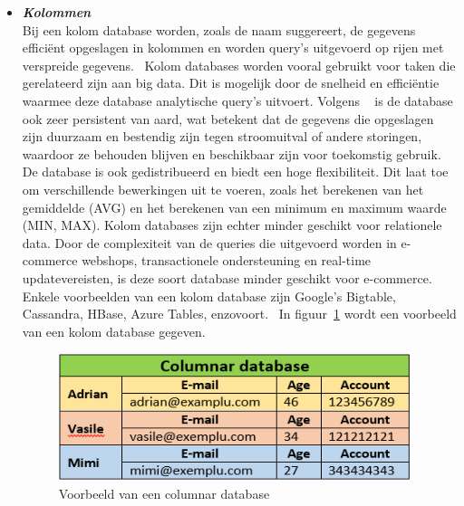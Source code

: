 \begin{itemize}
      \item \textbf{\textit{Kolommen}} \\
            Bij een kolom database worden, zoals de naam suggereert, de gegevens efficiënt opgeslagen in kolommen en worden query's uitgevoerd op rijen met verspreide gegevens.~\autocite{Microsoft} Kolom databases worden vooral gebruikt voor taken die gerelateerd zijn aan big data. Dit is mogelijk door de snelheid en efficiëntie waarmee deze database analytische query’s uitvoert. Volgens ~\textcite{DistributedDatabase2022} is de database ook zeer persistent van aard, wat betekent dat de gegevens die opgeslagen zijn duurzaam en bestendig zijn tegen stroomuitval of andere storingen, waardoor ze behouden blijven en beschikbaar zijn voor toekomstig gebruik. De database is ook gedistribueerd en biedt een hoge flexibiliteit. Dit laat toe om verschillende bewerkingen uit te voeren, zoals het berekenen van het gemiddelde (AVG) en het berekenen van een minimum en maximum waarde (MIN, MAX). Kolom databases zijn echter minder geschikt voor relationele data. Door de complexiteit van de queries die uitgevoerd worden in e-commerce webshops, transactionele ondersteuning en real-time updatevereisten, is deze soort database minder geschikt voor e-commerce. Enkele voorbeelden van een kolom database zijn Google's Bigtable, Cassandra, HBase, Azure Tables, enzovoort.~\autocite{DistributedDatabase2022} In figuur~\ref{fig:column} wordt een voorbeeld van een kolom database gegeven.
            \begin{figure}[H]
                \centering
                \includegraphics[width=0.7\linewidth]{graphics/column}
                \caption[Voorbeeld van een columnar database]{Voorbeeld van een columnar database ~\autocite{DistributedDatabase2022}}
                \label{fig:column}
            \end{figure}
            

\end{itemize}
